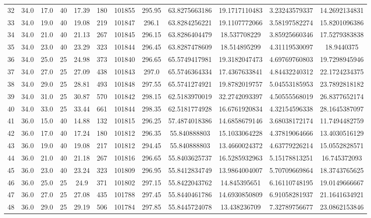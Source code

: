 \begin{table}[H]
\begin{center}
\begin{tabular}{|cccccccccccc|}
	32 & 34.0 & 17.0 & 40 & 17.39 & 180 & 101855 & 295.95 & 63.8275663186 & 19.1717110483 & 3.23243579337 & 14.2692134831\\
	33 & 34.0 & 19.0 & 40 & 19.08 & 219 & 101847 & 296.1 & 63.8284256221 & 19.1107772066 & 3.58197582274 & 15.8201096386\\
	34 & 34.0 & 21.0 & 40 & 21.13 & 267 & 101845 & 296.15 & 63.8286404479 & 18.537708229 & 3.85925660346 & 17.5279383838\\
	35 & 34.0 & 23.0 & 40 & 23.29 & 323 & 101844 & 296.45 & 63.8287478609 & 18.514895299 & 4.31119530097 & 18.9440375\\
	36 & 34.0 & 25.0 & 25 & 24.98 & 373 & 101840 & 296.65 & 65.5749417981 & 19.3182047473 & 4.69769760803 & 19.7298945946\\
	37 & 34.0 & 27.0 & 25 & 27.09 & 438 & 101843 & 297.0 & 65.5746364334 & 17.4367633841 & 4.84432240312 & 22.1724234375\\
	38 & 34.0 & 29.0 & 25 & 28.81 & 493 & 101848 & 297.55 & 65.5741274921 & 19.8782019757 & 5.04553185953 & 23.7892818182\\
	39 & 34.0 & 31.0 & 25 & 30.87 & 570 & 101842 & 298.15 & 62.5183970019 & 32.2742093397 & 4.50555568019 & 26.8377652174\\
	40 & 34.0 & 33.0 & 25 & 33.44 & 661 & 101844 & 298.35 & 62.5181774928 & 16.6761920834 & 4.32154596338 & 28.1645387097\\
	41 & 36.0 & 15.0 & 40 & 14.88 & 132 & 101815 & 296.25 & 57.4874018386 & 14.6858679146 & 3.68038172174 & 11.7494482759\\
	42 & 36.0 & 17.0 & 40 & 17.24 & 180 & 101812 & 296.35 & 55.840888803 & 15.1033064228 & 4.37819064666 & 13.4030516129\\
	43 & 36.0 & 19.0 & 40 & 19.08 & 217 & 101812 & 294.45 & 55.840888803 & 13.4660024372 & 4.63779226214 & 15.0552828571\\
	44 & 36.0 & 21.0 & 40 & 21.18 & 267 & 101816 & 296.65 & 55.8403625737 & 16.5285932963 & 5.15178813251 & 16.745372093\\
	45 & 36.0 & 23.0 & 40 & 23.24 & 323 & 101809 & 296.95 & 55.8412834749 & 13.9864004007 & 5.70709669864 & 18.3743765625\\
	46 & 36.0 & 25.0 & 25 & 24.9 & 371 & 101802 & 297.15 & 55.8422043762 & 14.845395651 & 6.16110748195 & 19.0149666667\\
	47 & 36.0 & 27.0 & 25 & 27.08 & 435 & 101788 & 297.45 & 55.8440461786 & 14.6930850809 & 6.91058281937 & 21.1641634921\\
	48 & 36.0 & 29.0 & 25 & 29.19 & 506 & 101784 & 297.85 & 55.8445724078 & 13.438236709 & 7.32789756677 & 23.0862153846\\

\end{tabular}
\end{center}
\end{table}
